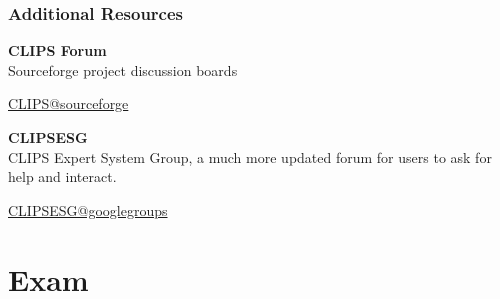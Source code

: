 \documentclass[xcolor={usenames,dvipsnames,svgnames}, compress]{beamer}
\begin{document}
\begin{frame}
  \frametitle{Additional Resources}

  \textbf{CLIPS Forum}\\
  Sourceforge project discussion boards
  \begin{flushright}
    \vspace{-5pt}
    \href{http://sourceforge.net/p/clipsrules/discussion/}{CLIPS@sourceforge}
  \end{flushright}

  
  \textbf{CLIPSESG}\\
  CLIPS Expert System Group, a much more updated forum for users to
  ask for help and interact.
  \begin{flushright}
    \vspace{-5pt}
    \href{https://groups.google.com/forum/\#!forum/CLIPSESG}{CLIPSESG@googlegroups}
  \end{flushright}
  
\end{frame}

\section{Exam}
{
  \begin{frame}
    \sectionpage
  \end{frame}
}
\end{document}
